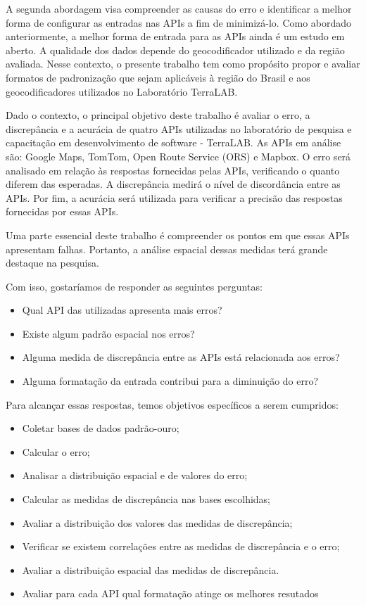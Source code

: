 A segunda abordagem visa compreender as causas do erro e identificar a melhor forma de configurar as entradas nas APIs a fim de minimizá-lo. Como abordado anteriormente, a melhor forma de entrada para as APIs ainda é um estudo em aberto. A qualidade dos dados depende do geocodificador utilizado e da região avaliada. Nesse contexto, o presente trabalho tem como propósito propor e avaliar formatos de padronização que sejam aplicáveis à região do Brasil e aos geocodificadores utilizados no Laboratório TerraLAB.

Dado o contexto, o principal objetivo deste trabalho é avaliar o erro, a discrepância e a acurácia de quatro APIs utilizadas no laboratório de pesquisa e capacitação em desenvolvimento de software - TerraLAB. As APIs em análise são: Google Maps, TomTom, Open Route Service (ORS) e Mapbox. O erro será analisado em relação às respostas fornecidas pelas APIs, verificando o quanto diferem das esperadas. A discrepância medirá o nível de discordância entre as APIs. Por fim, a acurácia será utilizada para verificar a precisão das respostas fornecidas por essas APIs.
    
Uma parte essencial deste trabalho é compreender os pontos em que essas APIs apresentam falhas. Portanto, a análise espacial dessas medidas terá grande destaque na pesquisa.

Com isso, gostaríamos de responder as seguintes perguntas:
\begin{itemize}
   \item Qual API das utilizadas apresenta mais erros?
   \item Existe algum padrão espacial nos erros?
   \item Alguma medida de discrepância entre as APIs está relacionada aos erros?
   \item Alguma formatação da entrada contribui para a diminuição do erro?
\end{itemize}

Para alcançar essas respostas, temos objetivos específicos a serem cumpridos:

\begin{itemize}
   \item Coletar bases de dados padrão-ouro;
   \item Calcular o erro;
   \item Analisar a distribuição espacial e de valores do erro;
   \item Calcular as medidas de discrepância nas bases escolhidas;
   \item Avaliar a distribuição dos valores das medidas de discrepância;
   \item Verificar se existem correlações entre as medidas de discrepância e o erro;
   \item Avaliar a distribuição espacial das medidas de discrepância. 
   \item Avaliar para cada API qual formatação atinge os melhores resutados
\end{itemize}

